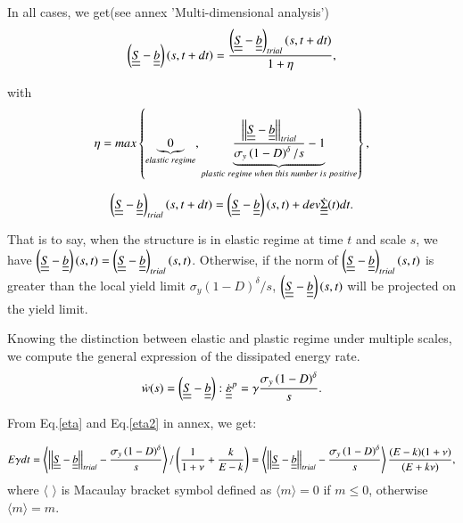 \documentclass[3p,times,number,review]{elsarticle}
\begin{document}
In all cases, we get(see annex 'Multi-dimensional analysis')
\begin{equation}
\left( \uline{\uline{S}}-\uline{\uline{b}}\right) (s,t+dt)=\dfrac{\left( \uline{\uline{S}}-\uline{\uline{b}}\right)_{trial} (s,t+dt)}{1+\eta},
\end{equation}

with $$\eta=max\left\lbrace \underbrace{0}_{elastic\; regime}, \underbrace{\dfrac{\left| \left|\uline{\uline{S}}-\uline{\uline{b}}\right| \right|_{trial}}{ \sigma_y\left(1-D\right)^\delta/s}-1}_{plastic \; regime\; when\; this\; number\; is\; positive}\right\rbrace, $$

$$\left( \uline{\uline{S}}-\uline{\uline{b}}\right)_{trial} (s,t+dt)=\left( \uline{\uline{S}}-\uline{\uline{b}}\right)(s,t)+dev\dot{\uline{\uline{\Sigma}}}(t)dt.$$

 That is to say, when the structure is in elastic regime at time $t$ and scale $s$, we have $\left( \uline{\uline{S}}-\uline{\uline{b}}\right)(s,t)=\left( \uline{\uline{S}}-\uline{\uline{b}}\right)_{trial} (s,t)$. Otherwise, if  the norm of $\left( \uline{\uline{S}}-\uline{\uline{b}}\right)_{trial} (s,t)$ is greater than the local yield limit $ \sigma_y\left(1-D\right)^\delta/s$, $\left( \uline{\uline{S}}-\uline{\uline{b}}\right)(s,t)$ will be projected on the yield limit. 
 
Knowing the distinction between elastic and plastic regime under multiple scales, we compute the general expression of the dissipated energy rate.
\begin{equation}
\dot{w}(s)=\left( \uline{\uline{S}}-\uline{\uline{b}}\right) :\dot{\uline{\uline{\varepsilon}}}^p=\gamma\dfrac{  \sigma_y\left(1-D\right)^\delta}{s}.
\label{w}
\end{equation}

From Eq.\eqref{eta} and Eq.\eqref{eta2} in annex, we get:

\begin{equation}E\gamma dt=\left\langle \left| \left|\uline{\uline{S}}-\uline{\uline{b}}\right| \right|_{trial}-\dfrac{ \sigma_y\left(1-D\right)^\delta}{s}\right\rangle /\left(\dfrac{1}{1+\nu}+\dfrac{k}{E-k} \right)=\left\langle \left| \left|\uline{\uline{S}}-\uline{\uline{b}}\right| \right|_{trial}-\dfrac{ \sigma_y\left(1-D\right)^\delta}{s}\right\rangle\dfrac{(E-k)(1+\nu) }{(E+k\nu)},
\label{gamma}
\end{equation}
where $\langle$ $\rangle$ is Macaulay bracket symbol defined as $\langle m\rangle=0$ if $m\leqslant0$, otherwise $\langle m\rangle=m$.
\end{document}
